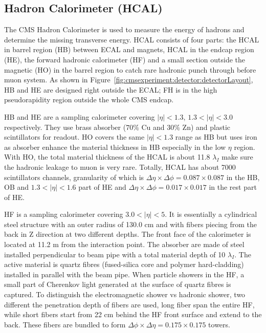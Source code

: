 \subsection{Hadron Calorimeter (HCAL)}
The CMS Hadron Calorimeter \cite{cms:hcalTdrCMS:1997xji} is used to measure the energy of hadrons and determine the missing transverse energy. HCAL consists of four parts: the HCAL in barrel region (HB) between ECAL and magnets, HCAL in the endcap region (HE), the forward hadronic calorimeter (HF) and a small section outside the magnetic (HO) in the barrel region to catch rare hadronic punch through before muon system. As shown in Figure~\ref{fig:cmsexperiment:detector:detectorLayout}, HB and HE are designed right outside the ECAL; FH is in the high pseudorapidity region outside the whole CMS endcap.

HB and HE are a sampling calorimeter covering $|\eta|< 1.3$, $1.3<|\eta|< 3.0$ respectively. They use brass absorber ($70\%$ Cu and $30\%$ Zn) and plastic scintillators for readout. HO covers the same $|\eta|< 1.3$ range as HB but uses iron as absorber enhance the material thickness in HB especially in the low $\eta$ region. With HO, the total material thickness of the HCAL is about 11.8 $\lambda_I$ make sure the hadronic leakage to muon is very rare. Totally, HCAL has about 7000 scintillators channels, granularity of which is $\Delta \eta \times \Delta \phi = 0.087 \times 0.087$ in the HB, OB and $1.3<|\eta|< 1.6$ part of HE and $\Delta \eta \times \Delta \phi = 0.017 \times 0.017$ in the rest part of HE.

HF is a sampling calorimeter covering $3.0 < |\eta| < 5$. It is essentially a cylindrical steel structure with an outer radius of 130.0 cm and with fibers piecing from the back in Z direction at two different depths. The front face of the calorimeter is located at 11.2 m from the interaction point. The absorber are made of steel installed perpendicular to beam pipe with a total material depth of 10 $\lambda_I$. The active material is quartz fibres (fused-silica core and polymer hard-cladding) installed in parallel with the beam pipe. When particle showers in the HF, a small part of Cherenkov light generated at the surface of quartz fibres is captured. To distinguish the electromagnetic shower vs hadronic shower, two different the penetration depth of fibers are used, long fiber span the entire HF, while short fibers start from 22 cm behind the HF front surface and extend to the back. These fibers are bundled to form $\Delta \phi \times \Delta \eta = 0.175 \times 0.175$ towers. 


